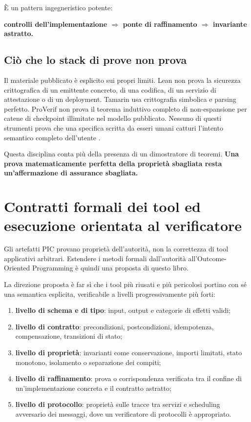 \documentclass[10pt,oneside,openany]{book}
\begin{document}
È un pattern ingegneristico potente:

\begin{center}
\sffamily\bfseries
controlli dell'implementazione $\Rightarrow$ ponte di raffinamento $\Rightarrow$ invariante astratto.
\end{center}

\section{Ciò che lo stack di prove non prova}
Il materiale pubblicato è esplicito sui propri limiti. Lean non prova la sicurezza crittografica di un emittente concreto, di una codifica, di un servizio di attestazione o di un deployment. Tamarin usa crittografia simbolica e parsing perfetto. ProVerif non prova il teorema induttivo completo di non-espansione per catene di checkpoint illimitate nel modello pubblicato. Nessuno di questi strumenti prova che una specifica scritta da esseri umani catturi l'intento semantico completo dell'utente \cite{picformal}.

Questa disciplina conta più della presenza di un dimostratore di teoremi. \textbf{Una prova matematicamente perfetta della proprietà sbagliata resta un'affermazione di assurance sbagliata.}

\chapter[Contratti formali dei tool ed esecuzione orientata al verificatore]{Contratti formali dei tool ed\texorpdfstring{\\}{ }esecuzione orientata al verificatore}\label{ch:toolcontracts}

Gli artefatti PIC provano proprietà dell'autorità, non la correttezza di tool applicativi arbitrari. Estendere i metodi formali dall'autorità all'Outcome-Oriented Programming è quindi una proposta di questo libro.

La direzione proposta è far sì che i tool più riusati e più pericolosi portino con sé una semantica esplicita, verificabile a livelli progressivamente più forti:

\begin{enumerate}
\item \textbf{livello di schema e di tipo}: input, output e categorie di effetti validi;
\item \textbf{livello di contratto}: precondizioni, postcondizioni, idempotenza, compensazione, transizioni di stato;
\item \textbf{livello di proprietà}: invarianti come conservazione, importi limitati, stato monotono, isolamento o separazione dei compiti;
\item \textbf{livello di raffinamento}: prova o corrispondenza verificata tra il confine di un'implementazione concreta e il contratto astratto;
\item \textbf{livello di protocollo}: proprietà sulle tracce tra servizi e scheduling avversario dei messaggi, dove un verificatore di protocolli è appropriato.
\end{enumerate}
\end{document}
